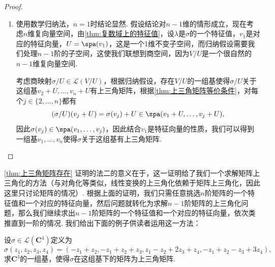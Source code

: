 \begin{proof}
\begin{enumerate}
        \item[法三:] 使用数学归纳法，$n=1$时结论显然. 假设结论对$n-1$维的情形成立，现在考虑$n$维复向量空间，由\autoref{thm:复数域上的特征值}，设$\lambda$是$\sigma$的一个特征值，$v_1$是对应的特征向量，$U=\spa(v_1)$，这是一个1维不变子空间，而归纳假设需要我们处理$n-1$阶的子空间，这使我们联想到商空间，因为$V/U$是一个很自然的$n-1$维复向量空间.

        考虑商映射$\sigma/U\in\mathcal{L}(V/U)$，根据归纳假设，存在$V/U$的一组基使得$\sigma/U$关于这组基$v_2+U,\ldots,v_n+U$有上三角矩阵，根据\autoref{thm:上三角矩阵等价条件}，对每个$j\in\{2,\ldots,n\}$都有\[(\sigma/U)(v_j+U)=\sigma(v_j)+U\in\spa(v_1+U,\ldots,v_j+U),\]
        因此$\sigma(v_j)\in\spa(v_1,\ldots,v_j)$，因此结合$v_1$是特征向量的性质，我们可以得到一组基$v_1,\ldots,v_n$使得$\sigma$关于这组基有上三角矩阵.
    \end{enumerate}
\end{proof}

\autoref{thm:上三角矩阵存在} 证明的法二的意义在于，这一证明给了我们一个求解矩阵上三角化的方法（与对角化等类似，线性变换的上三角化依赖于矩阵上三角化，因此这里只讨论矩阵的情况）. 根据上面的证明，我们只需任意挑选$n$阶矩阵的一个特征值和一个对应的特征向量，然后问题就转化为求解$n-1$阶矩阵的上三角化问题，那么我们继续求出$n-1$阶矩阵的一个特征值和一个对应的特征向量，依次类推直到一阶的情况. 我们给出下面的例子供读者运用这一方法：
\begin{example}{}{}
    设$\sigma\in \mathcal{L}(\mathbf{C}^4)$定义为
    \[\sigma(z_1,z_2,z_3,z_4)=(-z_1+z_2,-z_1+z_2+z_3,z_1-z_2+2z_3+z_4,-z_1+z_2-z_3+3z_4),\]
    求$\mathbf{C}^4$的一组基，使得$\sigma$在这组基下的矩阵为上三角矩阵.
\end{example}

